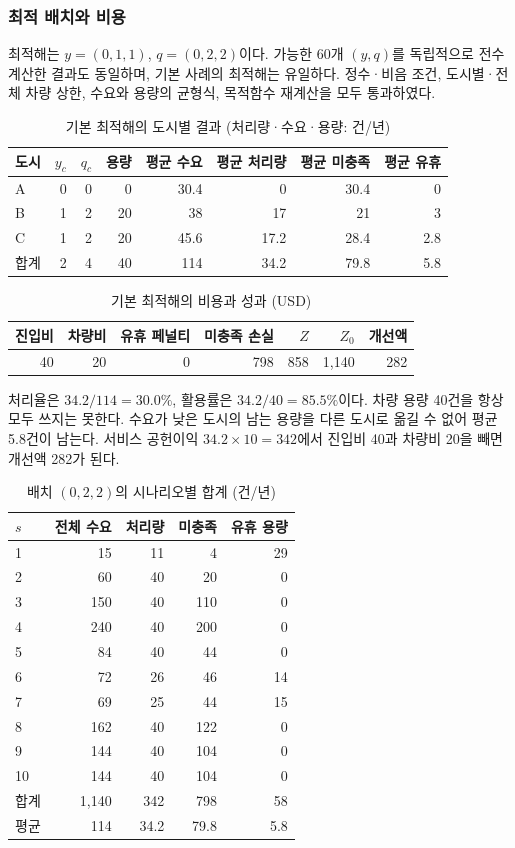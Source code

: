 \documentclass[10pt,a4paper]{article}
\begin{document}
\subsubsection{최적 배치와 비용}
최적해는 $y=(0,1,1)$, $q=(0,2,2)$이다.
가능한 60개 $(y,q)$를 독립적으로 전수계산한 결과도 동일하며, 기본 사례의 최적해는 유일하다.
정수·비음 조건, 도시별·전체 차량 상한, 수요와 용량의 균형식, 목적함수 재계산을 모두 통과하였다.
\begin{table}[H]
\centering\small
\caption{기본 최적해의 도시별 결과 (처리량·수요·용량: 건/년)}\label{tab:sc-base-city}
\begin{tabular}{lrrrrrrr}
\toprule
도시 & $y_c$ & $q_c$ & 용량 & 평균 수요 & 평균 처리량 & 평균 미충족 & 평균 유휴\\\midrule
A & 0 & 0 & 0 & 30.4 & 0 & 30.4 & 0\\
B & 1 & 2 & 20 & 38 & 17 & 21 & 3\\
C & 1 & 2 & 20 & 45.6 & 17.2 & 28.4 & 2.8\\
합계 & 2 & 4 & 40 & 114 & 34.2 & 79.8 & 5.8\\
\bottomrule
\end{tabular}
\end{table}
\begin{table}[H]
\centering\small
\caption{기본 최적해의 비용과 성과 (USD)}\label{tab:sc-base-cost}
\begin{tabular}{rrrrrrr}
\toprule
진입비 & 차량비 & 유휴 페널티 & 미충족 손실 & $Z$ & $Z_0$ & 개선액\\\midrule
40 & 20 & 0 & 798 & 858 & 1,140 & 282\\
\bottomrule
\end{tabular}
\end{table}
처리율은 $34.2/114=30.0\%$, 활용률은 $34.2/40=85.5\%$이다.
차량 용량 40건을 항상 모두 쓰지는 못한다. 수요가 낮은 도시의 남는 용량을 다른 도시로 옮길 수 없어 평균 5.8건이 남는다.
서비스 공헌이익 $34.2\times10=342$에서 진입비 40과 차량비 20을 빼면 개선액 282가 된다.
\begin{table}[H]
\centering\small
\caption{배치 $(0,2,2)$의 시나리오별 합계 (건/년)}\label{tab:sc-scenario-result}
\begin{tabular}{lrrrr}
\toprule
$s$ & 전체 수요 & 처리량 & 미충족 & 유휴 용량\\\midrule
1 & 15 & 11 & 4 & 29\\
2 & 60 & 40 & 20 & 0\\
3 & 150 & 40 & 110 & 0\\
4 & 240 & 40 & 200 & 0\\
5 & 84 & 40 & 44 & 0\\
6 & 72 & 26 & 46 & 14\\
7 & 69 & 25 & 44 & 15\\
8 & 162 & 40 & 122 & 0\\
9 & 144 & 40 & 104 & 0\\
10 & 144 & 40 & 104 & 0\\
합계 & 1,140 & 342 & 798 & 58\\
평균 & 114 & 34.2 & 79.8 & 5.8\\
\bottomrule
\end{tabular}
\end{table}
\end{document}
